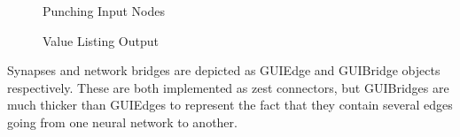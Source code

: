 \documentclass{acm_proc_article-sp}
\begin{document}
{\begin{figure}[t]
\centering
{}
\caption{Punching Input Nodes}
\label{fig:ui:configcharge}
\end{figure}

\begin{figure}[t]
\centering
{}
\caption{Value Listing Output}
\label{fig:ui:valuelisting}
\end{figure}

Synapses and network bridges are depicted as GUIEdge and GUIBridge objects respectively. These are both implemented as zest connectors, but GUIBridges are much thicker than GUIEdges to represent the fact that they contain several edges going from one neural network to another. 

}
\end{document}
